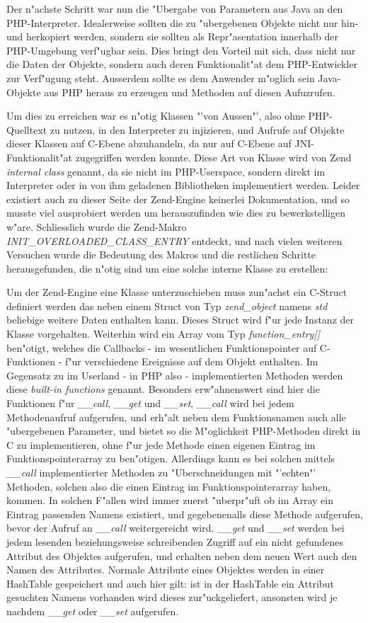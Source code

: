 Der n"achste Schritt war nun die "Ubergabe von Parametern aus Java an den PHP-Interpreter. Idealerweise sollten die zu "ubergebenen
Objekte nicht nur hin- und herkopiert werden, sondern sie sollten als Repr"asentation innerhalb der PHP-Umgebung verf"ugbar sein.
Dies bringt den Vorteil mit sich, dass nicht nur die Daten der Objekte, sondern auch deren Funktionalit"at dem PHP-Entwickler zur
Verf"ugung steht. Ausserdem sollte es dem Anwender m"oglich sein Java-Objekte aus PHP heraus zu erzeugen und Methoden auf diesen
Aufuzrufen.

Um dies zu erreichen war es n"otig Klassen "'von Aussen"', also ohne PHP-Quelltext zu nutzen, in den Interpreter zu injizieren,
und Aufrufe auf Objekte dieser Klassen auf C-Ebene abzuhandeln, da nur auf C-Ebene auf JNI-Funktionalit"at zugegriffen werden konnte. 
Diese Art von Klasse wird von Zend \emph{internal class} genannt, da sie nicht im PHP-Userspace, sondern direkt im Interpreter oder in von
ihm geladenen Bibliotheken implementiert werden.
Leider existiert auch zu dieser Seite der Zend-Engine keinerlei Dokumentation, und so musste viel ausprobiert werden um
herauszufinden wie dies zu bewerkstelligen w"are. Schliesslich wurde die Zend-Makro \emph{INIT\_OVERLOADED\_CLASS\_ENTRY} entdeckt,
und nach vielen weiteren Versuchen wurde die Bedeutung des Makros und die restlichen Schritte herausgefunden, die n"otig
sind um eine solche interne Klasse zu erstellen:

Um der Zend-Engine eine Klasse unterzuschieben muss zun"achst ein C-Struct definiert werden das neben einem Struct von Typ
\emph{zend\_object} namens \emph{std} beliebige weitere Daten enthalten kann. Dieses Struct wird f"ur jede Instanz der Klasse
vorgehalten. Weiterhin wird ein Array vom Typ \emph{function\_entry[]} ben"otigt, welches die Callbacks - im wesentlichen Funktionspointer
auf C-Funktionen - f"ur verschiedene Ereignisse auf dem Objekt enthalten. Im Gegensatz zu im Userland - in PHP also - implementierten
Methoden werden diese \emph{built-in functions} genannt.
Besonders erw"ahnenswert sind hier die Funktionen f"ur 
\emph{\_\_call}, \emph{\_\_get} und \emph{\_\_set}, \emph{\_\_call} wird bei jedem Methodenaufruf aufgerufen, und erh"alt neben dem
Funktionsnamen auch alle "ubergebenen Parameter, und bietet so die M"oglichkeit PHP-Methoden direkt in C zu implementieren, ohne f"ur jede
Methode einen eigenen Eintrag im Funktionspointerarray zu ben"otigen. Allerdings kann es bei solchen mittels \emph{\_\_call} implementierter
Methoden zu "Uberschneidungen mit "'echten"' Methoden, solchen also die einen Eintrag im Funktionspointerarray haben, kommen. In solchen
F"allen wird immer zuerst "uberpr"uft ob im Array ein Eintrag passenden Namens existiert, und gegebenenalls diese Methode aufgerufen, bevor
der Aufruf an  \emph{\_\_call} weitergereicht wird.
\emph{\_\_get} und \emph{\_\_set} werden bei jedem lesenden beziehungsweise schreibenden Zugriff auf ein nicht gefundenes Attribut des
Objektes aufgerufen, und erhalten neben dem neuen Wert auch den Namen des Attributes. Normale Attribute eines Objektes werden in einer
HashTable gespeichert und auch hier gilt: ist in der HashTable ein Attribut gesuchten Namens vorhanden wird dieses zur"uckgeliefert,
ansonsten wird je nachdem \emph{\_\_get} oder \emph{\_\_set} aufgerufen.

